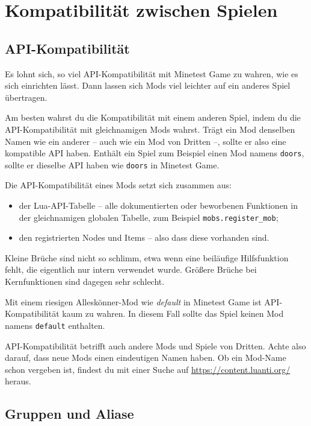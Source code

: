\section{Kompatibilität zwischen
Spielen}\label{kompatibilituxe4t-zwischen-spielen}

\subsection{API-Kompatibilität}\label{api-kompatibilituxe4t}

Es lohnt sich, so viel API-Kompatibilität mit Minetest Game zu wahren,
wie es sich einrichten lässt. Dann lassen sich Mods viel leichter auf
ein anderes Spiel übertragen.

Am besten wahrst du die Kompatibilität mit einem anderen Spiel, indem du
die API-Kompatibilität mit gleichnamigen Mods wahrst. Trägt ein Mod
denselben Namen wie ein anderer -- auch wie ein Mod von Dritten --,
sollte er also eine kompatible API haben. Enthält ein Spiel zum Beispiel
einen Mod namens \texttt{doors}, sollte er dieselbe API haben wie
\texttt{doors} in Minetest Game.

Die API-Kompatibilität eines Mods setzt sich zusammen aus:

\begin{itemize}
\tightlist
\item
  der Lua-API-Tabelle -- alle dokumentierten oder beworbenen Funktionen
  in der gleichnamigen globalen Tabelle, zum Beispiel
  \texttt{mobs.\allowbreak{}register\_\allowbreak{}mob};
\item
  den registrierten Nodes und Items -- also dass diese vorhanden sind.
\end{itemize}

Kleine Brüche sind nicht so schlimm, etwa wenn eine beiläufige
Hilfsfunktion fehlt, die eigentlich nur intern verwendet wurde. Größere
Brüche bei Kernfunktionen sind dagegen sehr schlecht.

Mit einem riesigen Alleskönner-Mod wie \emph{default} in Minetest Game
ist API-Kompatibilität kaum zu wahren. In diesem Fall sollte das Spiel
keinen Mod namens \texttt{default} enthalten.

API-Kompatibilität betrifft auch andere Mods und Spiele von Dritten.
Achte also darauf, dass neue Mods einen eindeutigen Namen haben. Ob ein
Mod-Name schon vergeben ist, findest du mit einer Suche auf
\url{https://content.luanti.org/} heraus.

\subsection{Gruppen und Aliase}\label{gruppen-und-aliase}

